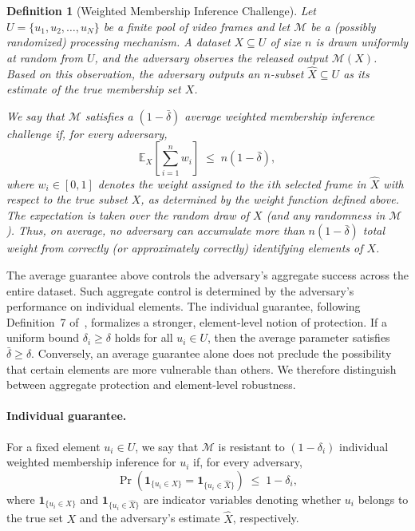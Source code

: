 \documentclass[letterpaper]{article} %
\newtheorem{definition}[theorem]{Definition}
\begin{document}
\begin{definition}[Weighted Membership Inference Challenge]\label{memebership inference challenge}
Let $U = \{u_1, u_2, \dots, u_N\}$ be a finite pool of video frames and let $\mathcal{M}$ be a (possibly randomized) processing mechanism. A dataset $X \subseteq U$ of size $n$ is drawn uniformly at random from $U$, and the adversary observes the released output $\mathcal{M}(X)$. Based on this observation, the adversary outputs an $n$-subset $\hat{X} \subseteq U$ as its estimate of the true membership set $X$.

We say that $\mathcal{M}$ satisfies a $(1-\bar{\delta})$ average weighted membership inference challenge if, for every adversary,
\begin{equation}\label{eq:inference}
    \mathbb{E}_{X}\!\left[\sum_{i=1}^n w_i \right]
    \;\le\; n(1-\bar{\delta}),
\end{equation}
where $w_i \in [0,1]$ denotes the weight assigned to the $i$th selected frame in $\hat{X}$ with respect to the true subset $X$, as determined by the weight function defined above. The expectation is taken over the random draw of $X$ (and any randomness in $\mathcal{M}$). Thus, on average, no adversary can accumulate more than $n(1-\bar{\delta})$ total weight from correctly (or approximately correctly) identifying elements of $X$.
\end{definition}

The average guarantee above controls the adversary's aggregate success across the entire dataset. Such aggregate control is determined by the adversary's performance on individual elements. The individual guarantee, following Definition~7 of~\cite{xiao2024formal}, formalizes a stronger, element-level notion of protection. If a uniform bound $\delta_i \ge \delta$ holds for all $u_i \in U$, then the average parameter satisfies $\bar{\delta} \ge \delta$. Conversely, an average guarantee alone does not preclude the possibility that certain elements are more vulnerable than others. We therefore distinguish between aggregate protection and element-level robustness.

\paragraph{Individual guarantee.}
For a fixed element $u_i \in U$, we say that $\mathcal{M}$ is resistant to $(1-\delta_i)$ individual weighted membership inference for $u_i$ if, for every adversary,
\[
\Pr\!\left(
    \mathbf{1}_{\{u_i \in X\}}
    =
    \mathbf{1}_{\{u_i \in \hat{X}\}}
\right)
\;\le\;
1 - \delta_i,
\]
where $\mathbf{1}_{\{u_i \in X\}}$ and $\mathbf{1}_{\{u_i \in \hat{X}\}}$ are indicator variables denoting whether $u_i$ belongs to the true set $X$ and the adversary's estimate $\hat{X}$, respectively.
\end{document}

